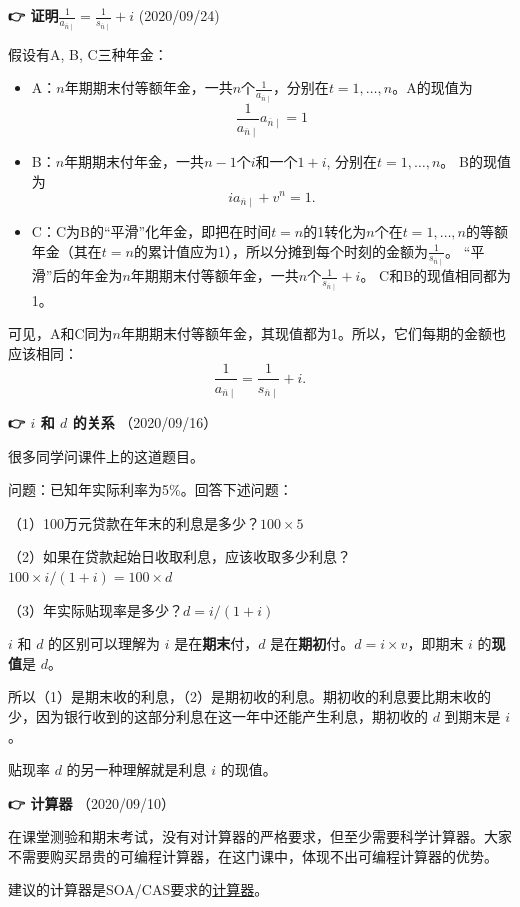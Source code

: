 \documentclass[
]{book}
\begin{document}
\textbf{👉 证明\(\frac{1}{a_{\overline{n}\mid}}=\frac{1}{s_{\overline{n}\mid}}+i\)} (2020/09/24)

假设有A, B, C三种年金：

\begin{itemize}
\item
  A：\(n\)年期期末付等额年金，一共\(n\)个\(\frac{1}{a_{\overline{n}\mid}}\)，分别在\(t=1,\ldots,n\)。A的现值为\[\frac{1}{a_{\overline{n}\mid}} a_{\overline{n}\mid}=1\]
\item
  B：\(n\)年期期末付年金，一共\(n-1\)个\(i\)和一个\(1+i\), 分别在\(t=1,\ldots,n\)。 B的现值为\[ia_{\overline{n}\mid}+v^n=1.\]
\item
  C：C为B的``平滑''化年金，即把在时间\(t=n\)的1转化为\(n\)个在\(t=1,\ldots,n\)的等额年金（其在\(t=n\)的累计值应为1），所以分摊到每个时刻的金额为\(\frac{1}{s_{\overline{n}\mid}}\)。 ``平滑''后的年金为\(n\)年期期末付等额年金，一共\(n\)个\(\frac{1}{s_{\overline{n}\mid}}+i\)。 C和B的现值相同都为1。
\end{itemize}

可见，A和C同为\(n\)年期期末付等额年金，其现值都为1。所以，它们每期的金额也应该相同：
\[\frac{1}{a_{\overline{n}\mid}}=\frac{1}{s_{\overline{n}\mid}}+i.\]

\textbf{👉 \(i\) 和 \(d\) 的关系} （2020/09/16）

很多同学问课件上的这道题目。

问题：已知年实际利率为5\%。回答下述问题：

（1）100万元贷款在年末的利息是多少？\(100\times5%
\)

（2）如果在贷款起始日收取利息，应该收取多少利息？\(100\times i/(1+i)=100\times d\)

（3）年实际贴现率是多少？\(d=i/(1+i)\)

\(i\) 和 \(d\) 的区别可以理解为 \(i\) 是在\textbf{期末}付，\(d\) 是在\textbf{期初}付。\(d=i\times v\)，即期末 \(i\) 的\textbf{现值}是 \(d\)。

所以（1）是期末收的利息，（2）是期初收的利息。期初收的利息要比期末收的少，因为银行收到的这部分利息在这一年中还能产生利息，期初收的 \(d\) 到期末是 \(i\)。

贴现率 \(d\) 的另一种理解就是利息 \(i\) 的现值。

\textbf{👉 计算器} （2020/09/10）

在课堂测验和期末考试，没有对计算器的严格要求，但至少需要科学计算器。大家不需要购买昂贵的可编程计算器，在这门课中，体现不出可编程计算器的优势。

建议的计算器是SOA/CAS要求的\href{https://www.soa.org/education/exam-req/exam-day-info/edu-id-calculators/}{计算器}。
\end{document}
